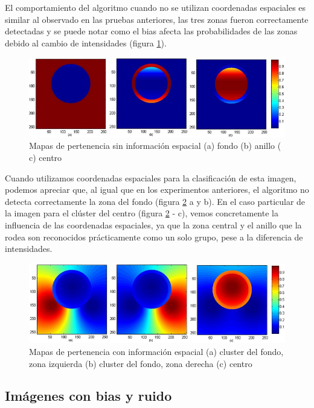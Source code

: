 El comportamiento del algoritmo cuando no se utilizan coordenadas espaciales es similar al observado en las pruebas anteriores, las tres zonas fueron correctamente detectadas y se puede notar como el bias afecta las probabilidades de las zonas debido al cambio de intensidades  (figura \ref{fig:matriz_circulo_bias}).

\begin{figure}[H]
\centering
\includegraphics[scale=0.3]{images/bias_sin_coord.jpg}
\caption{Mapas de pertenencia sin información espacial (a) fondo (b) anillo ( c) centro}
\label{fig:matriz_circulo_bias}
\end{figure}

Cuando utilizamos coordenadas espaciales para la clasificación de esta imagen, podemos apreciar que, al igual que en los experimentos anteriores, el algoritmo no detecta correctamente la zona del fondo (figura \ref{fig:matriz_circulo_bias_espacial} a y b). En el caso particular de la imagen para el clúster del centro (figura \ref{fig:matriz_circulo_bias_espacial} - c), vemos concretamente la influencia de las coordenadas espaciales, ya que la zona central y el anillo que la rodea son reconocidos prácticamente como un solo grupo, pese a la diferencia de intensidades.

\begin{figure}[H]
\centering
\includegraphics[scale=0.3]{images/bias_con_coord.jpg}
\caption{Mapas de pertenencia con información espacial (a) cluster del fondo, zona izquierda (b) cluster del fondo, zona derecha  (c) centro}
\label{fig:matriz_circulo_bias_espacial}
\end{figure}

\subsection{Imágenes con bias y ruido}

